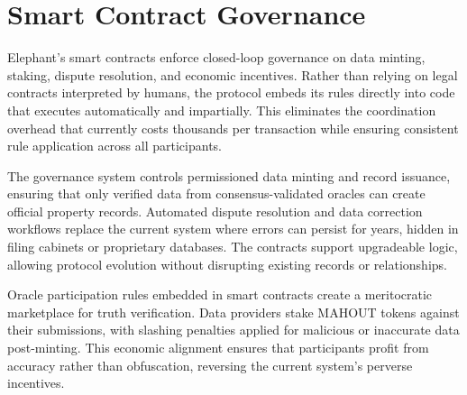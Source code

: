 \section{Smart Contract Governance}

Elephant's smart contracts enforce closed-loop governance on data minting, staking, dispute resolution, and economic incentives. Rather than relying on legal contracts interpreted by humans, the protocol embeds its rules directly into code that executes automatically and impartially. This eliminates the coordination overhead that currently costs thousands per transaction while ensuring consistent rule application across all participants.

The governance system controls permissioned data minting and record issuance, ensuring that only verified data from consensus-validated oracles can create official property records. Automated dispute resolution and data correction workflows replace the current system where errors can persist for years, hidden in filing cabinets or proprietary databases. The contracts support upgradeable logic, allowing protocol evolution without disrupting existing records or relationships.

Oracle participation rules embedded in smart contracts create a meritocratic marketplace for truth verification. Data providers stake MAHOUT tokens against their submissions, with slashing penalties applied for malicious or inaccurate data post-minting. This economic alignment ensures that participants profit from accuracy rather than obfuscation, reversing the current system's perverse incentives.

